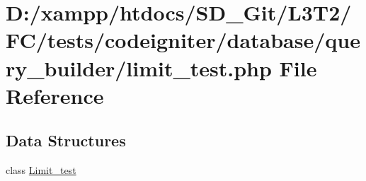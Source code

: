 \hypertarget{tests_2codeigniter_2database_2query__builder_2limit__test_8php}{}\section{D\+:/xampp/htdocs/\+S\+D\+\_\+\+Git/\+L3\+T2/\+F\+C/tests/codeigniter/database/query\+\_\+builder/limit\+\_\+test.php File Reference}
\label{tests_2codeigniter_2database_2query__builder_2limit__test_8php}
\subsection*{Data Structures}
\begin{DoxyCompactItemize}
\item 
class \hyperlink{class_limit__test}{Limit\+\_\+test}
\end{DoxyCompactItemize}
